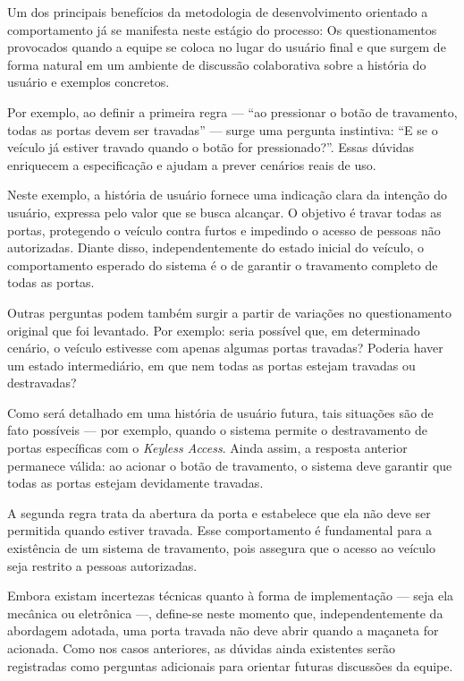 Um dos principais benefícios da metodologia de desenvolvimento orientado a comportamento já se manifesta neste estágio do processo: Os questionamentos 
provocados quando a equipe se coloca no lugar do usuário final e que surgem de forma natural em um ambiente de discussão colaborativa sobre a história 
do usuário e exemplos concretos.

Por exemplo, ao definir a primeira regra — “ao pressionar o botão de travamento, todas as portas devem ser travadas” — surge uma pergunta instintiva: 
“E se o veículo já estiver travado quando o botão for pressionado?”. Essas dúvidas enriquecem a especificação e ajudam a prever cenários reais de uso.

Neste exemplo, a história de usuário fornece uma indicação clara da intenção do usuário, expressa pelo valor que se busca alcançar. O objetivo é travar todas 
as portas, protegendo o veículo contra furtos e impedindo o acesso de pessoas não autorizadas. Diante disso, independentemente do estado inicial do veículo, 
o comportamento esperado do sistema é o de garantir o travamento completo de todas as portas.

Outras perguntas podem também surgir a partir de variações no questionamento original que foi levantado. Por exemplo: seria possível que, em determinado cenário, 
o veículo estivesse com apenas algumas portas travadas? Poderia haver um estado intermediário, em que nem todas as portas estejam travadas ou destravadas?

Como será detalhado em uma história de usuário futura, tais situações são de fato possíveis — por exemplo, quando o sistema permite o destravamento de portas 
específicas com o \textit{Keyless Access}. Ainda assim, a resposta anterior permanece válida: ao acionar o botão de travamento, o sistema deve garantir que todas as portas 
estejam devidamente travadas.

A segunda regra trata da abertura da porta e estabelece que ela não deve ser permitida quando estiver travada. Esse comportamento é fundamental para a existência 
de um sistema de travamento, pois assegura que o acesso ao veículo seja restrito a pessoas autorizadas.

Embora existam incertezas técnicas quanto à forma de implementação — seja ela mecânica ou eletrônica —, define-se neste momento que, independentemente da abordagem 
adotada, uma porta travada não deve abrir quando a maçaneta for acionada. Como nos casos anteriores, as dúvidas ainda existentes serão registradas como perguntas 
adicionais para orientar futuras discussões da equipe.


